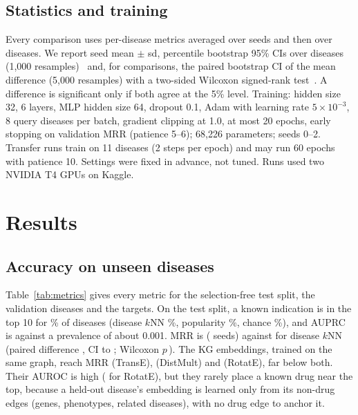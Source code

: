\documentclass[journal]{IEEEtran}
\begin{document}
\subsection{Statistics and training}
Every comparison uses per-disease metrics averaged over seeds and then over diseases. We report seed mean $\pm$ sd, percentile bootstrap 95\% CIs over diseases (1,000 resamples)~\cite{efron1993bootstrap} and, for comparisons, the paired bootstrap CI of the mean difference (5,000 resamples) with a two-sided Wilcoxon signed-rank test~\cite{wilcoxon1945}. A difference is significant only if both agree at the 5\% level. Training: hidden size 32, 6 layers, MLP hidden size 64, dropout 0.1, Adam with learning rate $5\times10^{-3}$, 8 query diseases per batch, gradient clipping at 1.0, at most 20 epochs, early stopping on validation MRR (patience 5--6); 68,226 parameters; seeds 0--2. Transfer runs train on 11 diseases (2 steps per epoch) and may run 60 epochs with patience 10. Settings were fixed in advance, not tuned. Runs used two NVIDIA T4 GPUs on Kaggle.

\section{Results}
\label{sec:results}
\subsection{Accuracy on unseen diseases}
\label{sec:aim2}
Table~\ref{tab:metrics} gives every metric for the selection-free test split, the validation diseases and the targets. On the test split, a known indication is in the top 10 for \TabModelTestAnyTen\% of diseases (disease $k$NN \TabKnnTestAnyTen\%, popularity \TabPopTestAnyTen\%, chance \RandExpAnyTenTest\%), and AUPRC is \TabModelTestAuprc{} against a prevalence of about 0.001. MRR is \TestMrr{} (\TestSeeds{} seeds) against \KnnTestMrr{} for disease $k$NN (paired difference \DiffTestKnn, CI \DiffLoTestKnn{} to \DiffHiTestKnn; Wilcoxon $p$\,\PwilTestKnn). The KG embeddings, trained on the same graph, reach MRR \KgeTranseTestMrr{} (TransE), \KgeDistmultTestMrr{} (DistMult) and \KgeRotateTestMrr{} (RotatE), far below both. Their AUROC is high (\KgeRotateTestAuroc{} for RotatE), but they rarely place a known drug near the top, because a held-out disease's embedding is learned only from its non-drug edges (genes, phenotypes, related diseases), with no drug edge to anchor it.
\end{document}
